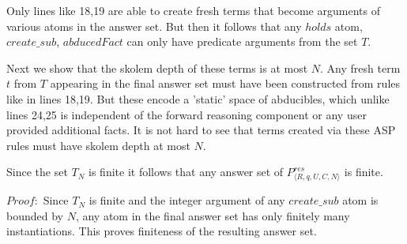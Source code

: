 Only lines like 18,19 are able to create fresh terms that become arguments of
various atoms in the answer set. But then it follows that any $holds$ atom,
$create\_sub$, $abducedFact$ can only have predicate arguments from the set $T$.

Next we show that the skolem depth of these terms is at most $N$. Any fresh
term $t$ from $T$ appearing in the final answer set must have been constructed
from rules like in lines 18,19. But these encode a 'static' space of
abducibles, which unlike lines 24,25 is independent of the forward reasoning
component or any user provided additional facts. It is not hard to see that
terms created via these ASP rules must have skolem depth at most $N$. 

\begin{lemma}
Since the set $T_{N}$ is finite it follows that any answer set of $P_{\langle
  R,q,U,C,N \rangle}^{res}$ is finite.
\end{lemma}

$Proof:$ Since $T_{N}$ is finite and the integer argument of any $create\_sub$
atom is bounded by $N$, any atom in the final answer set has only finitely
many instantiations. This proves finiteness of the resulting answer set.

